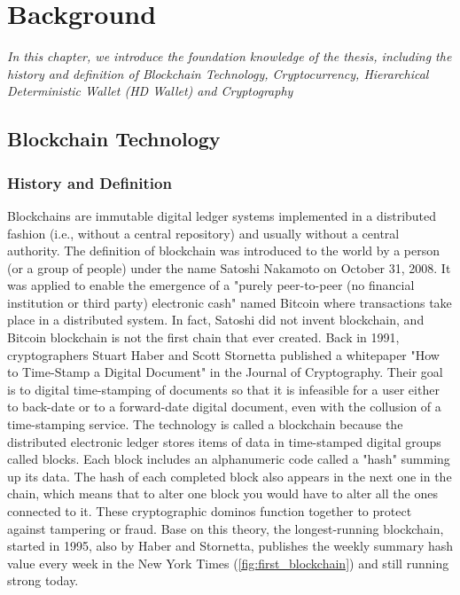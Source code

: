 \chapter{Background}
\label{chap:background}
	\textit{In this chapter, we introduce the foundation knowledge of the thesis, including the history and definition of Blockchain Technology, Cryptocurrency, 
	Hierarchical Deterministic Wallet (HD Wallet) and Cryptography}
\minitoc

\section{Blockchain Technology}

\subsection{History and Definition}

Blockchains are immutable digital ledger systems implemented in a distributed fashion (i.e., without a central repository) and usually without a central authority.
The definition of blockchain was introduced to the world by a person (or a group of people) under the name Satoshi Nakamoto on October 31, 2008. 
It was applied to enable the emergence of a "purely peer-to-peer (no financial institution or third party) electronic cash" named Bitcoin where transactions take place in a distributed system.
In fact, Satoshi did not invent blockchain, and Bitcoin blockchain is not the first chain that ever created. 
Back in 1991, cryptographers Stuart Haber and Scott Stornetta published a whitepaper "How to Time-Stamp a Digital Document" in the Journal of Cryptography. 
Their goal is to digital time-stamping of documents so that it is infeasible for a user either to back-date or to a forward-date digital document, even with the collusion of a time-stamping service. 
The technology is called a blockchain because the distributed electronic ledger stores items of data in time-stamped digital groups called blocks. Each block includes an alphanumeric code called a "hash" summing up its data. The hash of each completed block also appears in the next one in the chain, which means that to alter one block you would have to alter all the ones connected to it. These cryptographic dominos function together to protect against tampering or fraud.
Base on this theory, the longest-running blockchain, started in 1995, also by Haber and Stornetta, publishes the weekly summary hash value every week in the New York Times (\autoref{fig:first_blockchain}) and still running strong today. 

